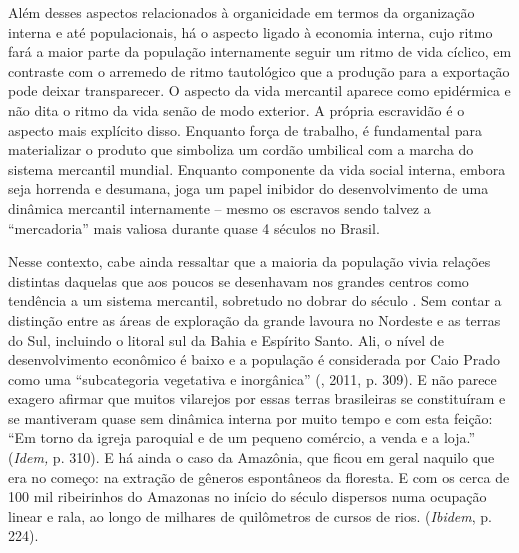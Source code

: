 {Além desses aspectos relacionados à organicidade em termos da
organização interna e até populacionais, há o aspecto ligado à economia
interna, cujo ritmo fará a maior parte da população internamente seguir
um ritmo de vida cíclico, em contraste com o arremedo de ritmo
tautológico que a produção para a exportação pode deixar transparecer. O
aspecto da vida mercantil aparece como epidérmica e não dita o ritmo da
vida senão de modo exterior. A própria escravidão é o aspecto mais
explícito disso. Enquanto força de trabalho, é fundamental para
materializar o produto que simboliza um cordão umbilical com a marcha do
sistema mercantil mundial. Enquanto componente da vida social interna,
embora seja horrenda e desumana, joga um papel inibidor do
desenvolvimento de uma dinâmica mercantil internamente -- mesmo os
escravos sendo talvez a ``mercadoria'' mais valiosa durante quase 4
séculos no Brasil.

Nesse contexto, cabe ainda ressaltar que a maioria da população vivia
relações distintas daquelas que aos poucos se desenhavam nos grandes
centros como tendência a um sistema mercantil, sobretudo no dobrar do
século . Sem contar a distinção entre as áreas de exploração da
grande lavoura no Nordeste e as terras do Sul, incluindo o litoral sul
da Bahia e Espírito Santo. Ali, o nível de desenvolvimento econômico é
baixo e a população é considerada por Caio Prado como uma ``subcategoria
vegetativa e inorgânica'' (, 2011, p. 309). E não parece exagero
afirmar que muitos vilarejos por essas terras brasileiras se
constituíram e se mantiveram quase sem dinâmica interna por muito tempo
e com esta feição: ``Em torno da igreja paroquial e de um pequeno
comércio, a venda e a loja.'' (\emph{Idem,} p. 310). E há ainda o caso
da Amazônia, que ficou em geral naquilo que era no começo: na extração
de gêneros espontâneos da floresta. E com os cerca de 100 mil
ribeirinhos do Amazonas no início do século  dispersos numa ocupação
linear e rala, ao longo de milhares de quilômetros de cursos de rios.
(\emph{Ibidem}, p. 224).

}
